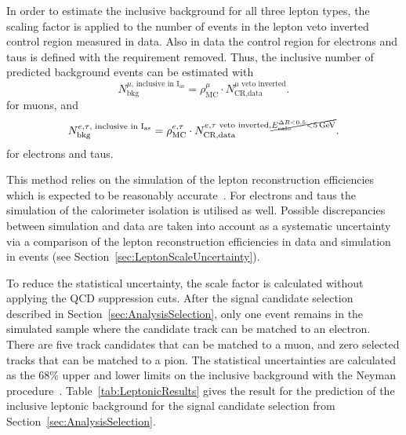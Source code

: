 In order to estimate the inclusive background for all three lepton types, the scaling factor \leptonscalefactor is applied to the number of events in the lepton veto inverted control region measured in data.
Also in data the control region for electrons and taus is defined with the \ecalo requirement removed. 
Thus, the inclusive number of predicted background events can be estimated with  
\begin{equation*}
N^{\mu \text{, inclusive in I$_{\text{as}}$}}_{\text{bkg}} = \rho_{\text{MC}}^{\mu} \cdot N_{\text{CR,data}}^{\mu\text{ veto inverted}}.
\end{equation*}
for muons, and 
\begin{equation*}
N^{e,\tau\text{, inclusive in I$_{\text{as}}$}}_{\text{bkg}} = \rho_{\text{MC}}^{e,\tau} \cdot N_{\text{CR,data}}^{e,\tau\text{ veto inverted}, \cancel{E^{\Delta R<0.5}_{\text{calo}}<5\,\text{Ge}\kern-0.06667em\text{V}}}.
\end{equation*}
for electrons and taus.

This method relies on the simulation of the lepton reconstruction efficiencies which is expected to be reasonably accurate~\cite{bib:CMS:elec_recoEff,bib:CMS:muon_recoEff,bib:CMS:tau_recoEff}.
For electrons and taus the simulation of the calorimeter isolation is utilised as well.
Possible discrepancies between simulation and data are taken into account as a systematic uncertainty via a comparison of the lepton reconstruction efficiencies in data and simulation in \Zlep events (see Section~\ref{sec:LeptonScaleUncertainty}).

To reduce the statistical uncertainty, the scale factor is calculated without applying the QCD suppression cuts. 
After the signal candidate selection described in Section~\ref{sec:AnalysisSelection}, only one event remains in the simulated \WJets sample where the candidate track can be matched to an electron.
There are five track candidates that can be matched to a muon, and zero selected tracks that can be matched to a pion.
The statistical uncertainties are calculated as the 68\% upper and lower limits on the inclusive background with the Neyman procedure~\cite{bib:Neyman_1937,bib:PDG_2014}.
Table~\ref{tab:LeptonicResults} gives the result for the prediction of the inclusive leptonic background for the signal candidate selection from Section~\ref{sec:AnalysisSelection}.

